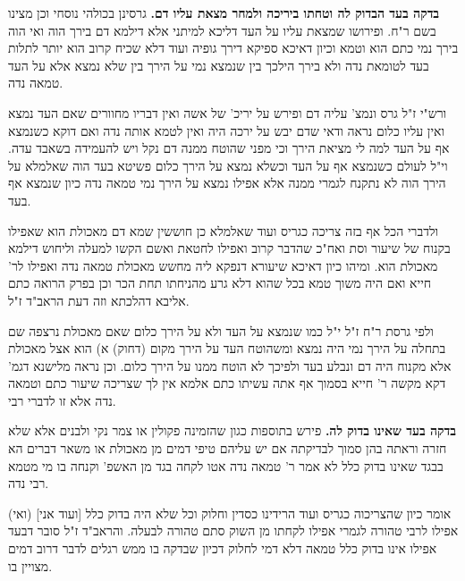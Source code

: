 \documentclass[12pt, openany]{book}
\begin{document}
{\par\textbf{בדקה בעד הבדוק לה וטחתו ביריכה ולמחר מצאת עליו דם.}  גרסינן בכולהי נוסחי וכן מצינו בשם ר"ח. ופירושו שמצאת עליו על העד דליכא למיתני אלא דילמא דם בירך הוה ואי הוה בירך נמי כתם הוא וטמא וכיון דאיכא ספיקא דירך גופיה ועוד דלא שכיח קרוב הוא יותר לתלות בעד לטומאת נדה ולא בירך הילכך בין שנמצא נמי על הירך בין שלא נמצא אלא על העד טמאה נדה.\par  ורש"י ז"ל גרס ונמצ' עליה דם ופירש על יריכ' של אשה ואין דבריו מחוורים שאם העד נמצא ואין עליו כלום נראה ודאי שדם יבש על ירכה היה ואין לטמא אותה נדה ואם דוקא כשנמצא אף על העד למה לי מציאת הירך וכי מפני שהוטח ממנה דם נקל ויש להעמידה בשאבד עדה. וי"ל לעולם כשנמצא אף על העד וכשלא נמצא על הירך כלום פשיטא בעד הוה שאלמלא על הירך הוה לא נתקנח לגמרי ממנה אלא אפילו נמצא על הירך נמי טמאה נדה כיון שנמצא אף בעד.\par  ולדברי הכל אף בזה צריכה כגריס ועוד שאלמלא כן חוששין שמא דם מאכולת הוא שאפילו בקנוח של שיעור וסת ואח"כ שהדבר קרוב ואפילו לחטאת ואשם הקשו למעלה וליחוש דילמא מאכולת הוא. ומיהו כיון דאיכא שיעורא דנפקא ליה מחשש מאכולת טמאה נדה ואפילו לר' חייא ואם היה משוך טמא בכל שהוא דלא גרע מהניחתו תחת הכר וכן בפרק הרואה כתם אליבא דהלכתא וזה דעת הראב"ד ז"ל.\par ולפי גרסת ר"ח ז"ל י"ל כמו שנמצא על העד ולא על הירך כלום שאם מאכולת נרצפה שם בתחלה על הירך נמי היה נמצא ומשהוטח העד על הירך מקום (דחוק) א) הוא אצל מאכולת אלא מקנוח היה דם ונבלע בעד ולפיכך לא הוטח ממנו על הירך כלום. וכן נראה מלישנא דגמ' דקא מקשה ר' חייא בסמוך אף אתה עשיתו כתם אלמא אין לך שצריכה שיעור כתם וטמאה נדה אלא זו לדברי רבי. 
\par\textbf{בדקה בעד שאינו בדוק לה.}  פירש בתוספות כגון שהזמינה פקולין או צמר נקי ולבנים אלא שלא חזרה וראתה בהן סמוך לבדיקתה אם יש עליהם טיפי דמים מן מאכולת או משאר דברים הא בבגד שאינו בדוק כלל לא אמר ר' טמאה נדה אטו לקחה בגד מן האשפ' וקנחה בו מי מטמא רבי נדה.\par  (ואי) [ועוד אני] אומר כיון שהצריכוה כגריס ועוד הרידינו כסדין וחלוק וכל שלא היה בדוק כלל אפילו לרבי טהורה לגמרי אפילו לקחתו מן השוק סתם טהורה לבעלה. והראב"ד ז"ל סובר דבעד אפילו אינו בדוק כלל טמאה דלא דמי לחלוק דכיון שבדקה בו ממש רגלים לדבר דרוב דמים מצויין בו. 
\par}
\end{document}

